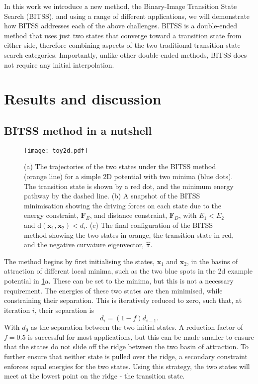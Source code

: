 \documentclass[twocolumn,10pt]{revtex4-2}
\begin{document}
In this work we introduce a new method, the Binary-Image Transition State Search (BITSS), and using a range of different applications, we will demonstrate how BITSS addresses each of the above challenges.
BITSS is a double-ended method that uses just two states that converge toward a transition state from either side, therefore combining aspects of the two traditional transition state search categories.
Importantly, unlike other double-ended methods, BITSS does not require any initial interpolation.


\section{Results and discussion}
\subsection{BITSS method in a nutshell}

\begin{figure}[htb]
  \texttt{[image: toy2d.pdf]}
  \caption{\label{fig:toy2d}
    (a) The trajectories of the two states under the BITSS method (orange line) for a simple 2D potential with two minima (blue dots).
        The transition state is shown by a red dot, and the minimum energy pathway by the dashed line.
    (b) A snapshot of the BITSS minimisation showing the driving forces on each state due to the energy constraint, $\bm{F}_E$, and distance constraint, $\bm{F}_D$, with $E_1 < E_2$ and $\mathrm{d}(\bm{x}_1,\bm{x}_2) < d_i$.
    (c) The final configuration of the BITSS method showing the two states in orange, the transition state in red, and the negative curvature eigenvector, $\bm{\hat{\tau}}$.
  }
\end{figure}

The method begins by first initialising the states, $\bm{x}_1$ and $\bm{x}_2$, in the basins of attraction of different local minima, such as the two blue spots in the 2d example potential in \cref{fig:toy2d}a.
These can be set to the minima, but this is not a necessary requirement.
The energies of these two states are then minimised, while constraining their separation.
This is iteratively reduced to zero, such that, at iteration $i$, their separation is
\begin{equation}\label{eq:diteration}
  d_i = (1 - f) d_{i-1}.
\end{equation}
With $d_0$ as the separation between the two initial states.
A reduction factor of $f = 0.5$ is successful for most applications, but this can be made smaller to ensure that the states do not slide off the ridge between the two basin of attraction.
To further ensure that neither state is pulled over the ridge, a secondary constraint enforces equal energies for the two states.
Using this strategy, the two states will meet at the lowest point on the ridge - the transition state.
\end{document}
